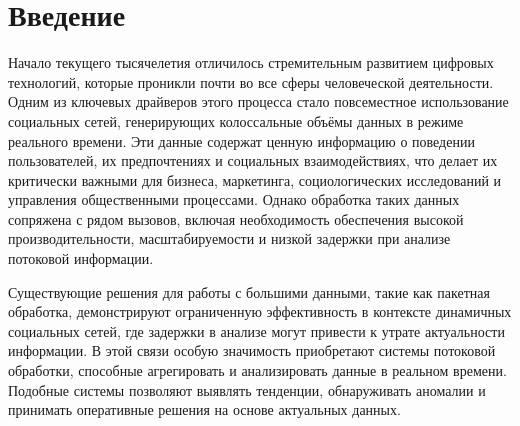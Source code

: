 \section{Введение}
\label{sec:Chapter0} 
    Начало текущего тысячелетия отличилось стремительным развитием цифровых технологий, которые проникли почти во все сферы человеческой деятельности. Одним из ключевых драйверов этого процесса стало повсеместное использование социальных сетей, генерирующих колоссальные объёмы данных в режиме реального времени. Эти данные содержат ценную информацию о поведении пользователей, их предпочтениях и социальных взаимодействиях, что делает их критически важными для бизнеса, маркетинга, социологических исследований и управления общественными процессами. Однако обработка таких данных сопряжена с рядом вызовов, включая необходимость обеспечения высокой производительности, масштабируемости и низкой задержки при анализе потоковой информации.

    \medskip
    Существующие решения для работы с большими данными, такие как пакетная обработка, демонстрируют ограниченную эффективность в контексте динамичных социальных сетей, где задержки в анализе могут привести к утрате актуальности информации. В этой связи особую значимость приобретают системы потоковой обработки, способные агрегировать и анализировать данные в реальном времени. Подобные системы позволяют выявлять тенденции, обнаруживать аномалии и принимать оперативные решения на основе актуальных данных. 

